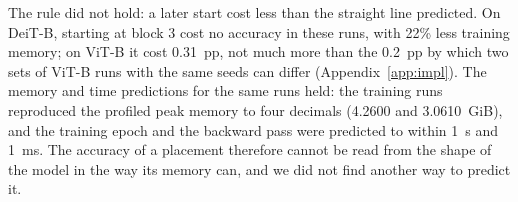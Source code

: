 The rule did not hold: a later start cost less than the straight line predicted. On DeiT-B, starting at block 3
cost no accuracy in these runs, with 22\% less training memory; on ViT-B it cost 0.31~pp, not much more than the
0.2~pp by which two sets of ViT-B runs with the same seeds can differ (Appendix~\ref{app:impl}). The memory and time predictions for the same
runs held: the training runs reproduced the profiled peak memory to four decimals (4.2600 and 3.0610~GiB), and the
training epoch and the backward pass were predicted to within 1~s and 1~ms. The accuracy of a placement therefore
cannot be read from the shape of the model in the way its memory can, and we did not find another way to predict it.
